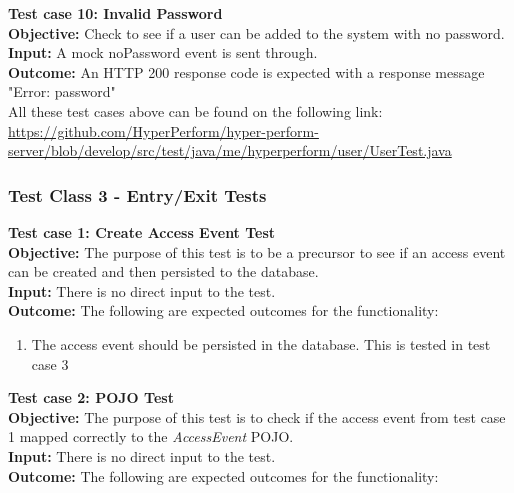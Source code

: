 \documentclass[11pt,a4paper]{article}
\begin{document}
\textbf{Test case 10: Invalid Password} \\
\textbf{Objective: } Check to see if a user can be added to the system with no password. \\
\textbf{Input: }  A mock noPassword event is sent through.\\
\textbf{Outcome: } An HTTP 200 response code is expected with a response message "Error: password" \\

All these test cases above can be found on the following link: \url{https://github.com/HyperPerform/hyper-perform-server/blob/develop/src/test/java/me/hyperperform/user/UserTest.java}

\subsubsection{Test Class 3 - Entry/Exit Tests}	
\textbf{Test case 1: Create Access Event Test} \\
\textbf{Objective: } The purpose of this test is to be a precursor to see if an access event can be created and then persisted to the database. \\
\textbf{Input: } There is no direct input to the test. \\
\textbf{Outcome: } The following are expected outcomes for the functionality: 
\begin{enumerate}
	\item The access event should be persisted in the database. This is tested in test case 3\\
\end{enumerate}
\noindent
\textbf{Test case 2: POJO Test} \\
\textbf{Objective: } The purpose of this test is to check if the access event from test case 1 mapped correctly to the \textit{AccessEvent} POJO. \\
\textbf{Input: } There is no direct input to the test. \\
\textbf{Outcome: } The following are expected outcomes for the functionality:
\end{document}

